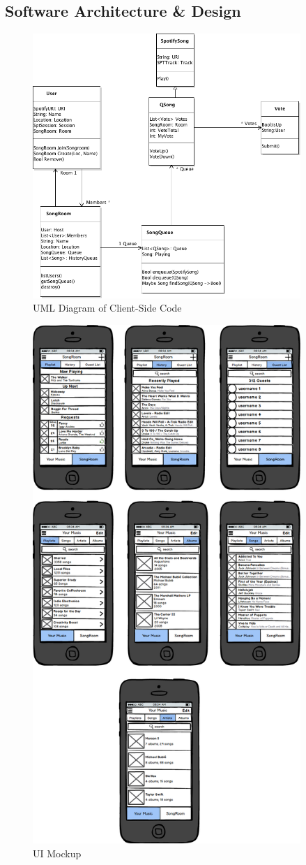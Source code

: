 \documentclass[12pt]{article}
\begin{document}
\subsection{Software Architecture \& Design}
\begin{figure}[h]
  \centering
  \includegraphics[width=4in]{ClassDiagram}
  \caption {UML Diagram of Client-Side Code}
\end{figure}


\begin{figure}[htb!]
  \centering
  \includegraphics[width=4in]{mockup.png}
  \caption {UI Mockup}
\end{figure}
\end{document}
